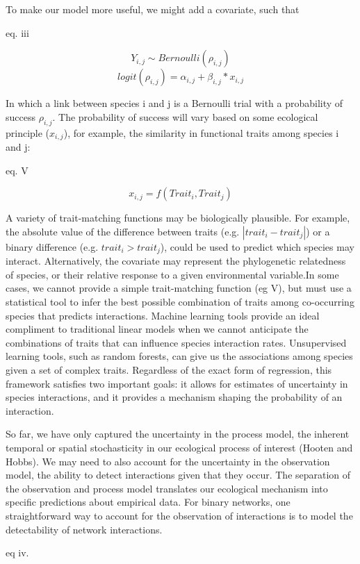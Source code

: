 To make our model more useful, we might add a covariate, such that

eq. iii

\[ Y_{i,j} \sim Bernoulli(\rho_{i,j})\] \[ logit(\rho_{i,j}) = \alpha_{i,j} +
\beta_{i,j} * x_{i,j} \]

In which a link between species i and j is a Bernoulli trial with a probability
of success \(\rho_{i,j}\). The probability of success will vary based on some
ecological principle (\(x_{i,j}\)), for example, the similarity in functional
traits among species i and j:

eq. V

\[x_{i,j}= f(Trait_i,Trait_j)\]

A variety of trait-matching functions may be biologically plausible. For
example, the absolute value of the difference between traits (e.g. \(|trait_i -
trait_j|\)) or a binary difference (e.g. \(trait_i > trait_j\)), could be used
to predict which species may interact. Alternatively, the covariate may
represent the phylogenetic relatedness of species, or their relative response to
a given environmental variable.In some cases, we cannot provide a simple
trait-matching function (eg V), but must use a statistical tool to infer the
best possible combination of traits among co-occurring species that predicts
interactions. Machine learning tools provide an ideal compliment to traditional
linear models when we cannot anticipate the combinations of traits that can
influence species interaction rates. Unsupervised learning tools, such as random
forests, can give us the associations among species given a set of complex
traits. Regardless of the exact form of regression, this framework satisfies two
important goals: it allows for estimates of uncertainty in species interactions,
and it provides a mechanism shaping the probability of an interaction.

So far, we have only captured the uncertainty in the process model, the inherent
temporal or spatial stochasticity in our ecological process of interest (Hooten
and Hobbs). We may need to also account for the uncertainty in the observation
model, the ability to detect interactions given that they occur. The separation
of the observation and process model translates our ecological mechanism into
specific predictions about empirical data. For binary networks, one
straightforward way to account for the observation of interactions is to model
the detectability of network interactions.

eq iv.

